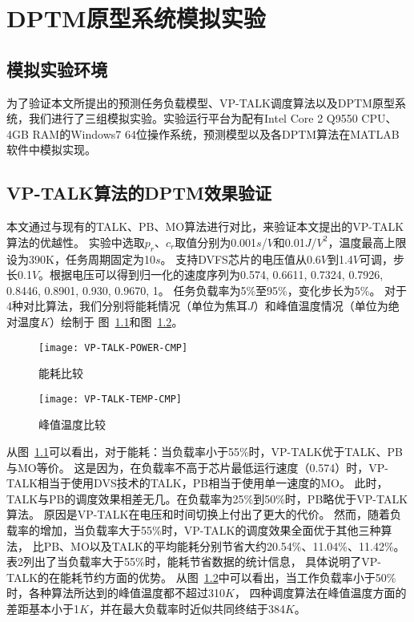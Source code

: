 


\chapter{DPTM原型系统模拟实验}
\label{cha:DPTMexperiments}

\section{模拟实验环境}
为了验证本文所提出的预测任务负载模型、VP-TALK调度算法以及DPTM原型系统，我们进行了三组模拟实验。实验运行平台为配有Intel Core 2 Q9550 CPU、4GB RAM的Windows7 64位操作系统，预测模型以及各DPTM算法在MATLAB软件中模拟实现。

\section{VP-TALK算法的DPTM效果验证}
本文通过与现有的TALK、PB、MO算法进行对比，来验证本文提出的VP-TALK算法的优越性。 实验中选取$p_r$、$c_r$取值分别为0.001$s$/$V$和0.01$J$/$V^2$，温度最高上限设为390K，任务周期固定为10$s$。 支持DVFS芯片的电压值从0.6$V$到1.4$V$可调，步长0.1$V$。根据电压可以得到归一化的速度序列为{0.574, 0.6611, 0.7324, 0.7926, 0.8446, 0.8901, 0.930, 0.9670, 1}。 任务负载率为5\%至95\%，变化步长为5\%。 对于4种对比算法，我们分别将能耗情况（单位为焦耳$J$）和峰值温度情况（单位为绝对温度$K$）绘制于 图~\ref{fig:vp-talk-power-cmp}和图~\ref{fig:vp-talk-temp-cmp}。

\begin{figure}[H] 
  \centering
  \texttt{[image: VP-TALK-POWER-CMP]}
  \caption{能耗比较}
  \label{fig:vp-talk-power-cmp}
\end{figure}

\begin{figure}[H] 
  \centering
  \texttt{[image: VP-TALK-TEMP-CMP]}
  \caption{峰值温度比较}
  \label{fig:vp-talk-temp-cmp}
\end{figure}

从图~\ref{fig:vp-talk-power-cmp}可以看出，对于能耗：当负载率小于55\%时，VP-TALK优于TALK、PB与MO等价。 这是因为，在负载率不高于芯片最低运行速度（0.574）时，VP-TALK相当于使用DVS技术的TALK，PB相当于使用单一速度的MO。 此时，TALK与PB的调度效果相差无几。在负载率为25\%到50\%时，PB略优于VP-TALK算法。 原因是VP-TALK在电压和时间切换上付出了更大的代价。 然而，随着负载率的增加，当负载率大于55\%时，VP-TALK的调度效果全面优于其他三种算法， 比PB、MO以及TALK的平均能耗分别节省大约20.54\%、11.04\%、11.42\%。表2列出了当负载率大于55\%时，能耗节省数据的统计信息， 具体说明了VP-TALK的在能耗节约方面的优势。
从图~\ref{fig:vp-talk-temp-cmp}中可以看出，当工作负载率小于50\%时，各种算法所达到的峰值温度都不超过310$K$， 四种调度算法在峰值温度方面的差距基本小于1$K$，并在最大负载率时近似共同终结于384$K$。

